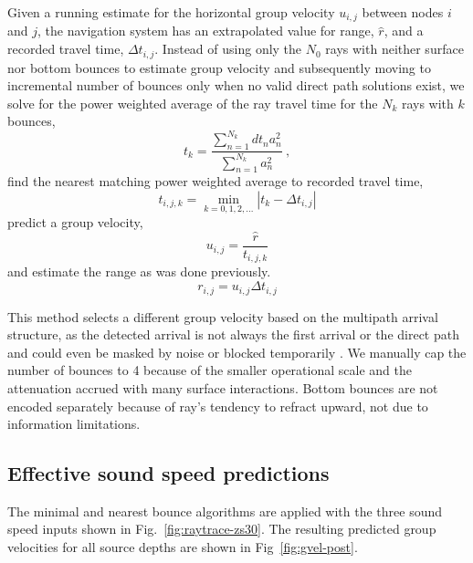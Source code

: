 Given a running estimate for the horizontal group velocity $u_{i,j}$ between nodes $i$ and $j$, the navigation system has an extrapolated value for range, $\hat{r}$, and a recorded travel time, $\Delta t_{i,j}$.
Instead of using only the $N_0$ rays with neither surface nor bottom bounces to estimate group velocity and subsequently moving to incremental number of bounces only when no valid direct path solutions exist, we solve for the power weighted average of the ray travel time for the $N_k$ rays with $k$ bounces,
\begin{equation}
t_k = \frac{\sum_{n=1}^{N_{k}} dt_{n}a_{n}^{2}}{\sum_{n=1}^{N_{k}} a_{n}^{2}} ~, 
\end{equation}
find the nearest matching power weighted average to recorded travel time,
\begin{equation}
t_{i,j,k} = \min_{k=0,1,2,...} \left| t_k - \Delta t_{i,j} \right|
\end{equation}
predict a group velocity,
\begin{equation}
u_{i,j} = \dfrac{\hat{r}}{t_{i,j,k}}
\end{equation}
and estimate the range as was done previously.
\begin{equation}
r_{i,j} = u_{i,j}\Delta t_{i,j}
\end{equation}

This method selects a different group velocity based on the multipath arrival structure, as the detected arrival is not always the first arrival or the direct path and could even be masked by noise or blocked temporarily \citep{deffenbaugh_acoustic_1996}.
We manually cap the number of bounces to 4 because of the smaller operational scale and the attenuation accrued with many surface interactions.
Bottom bounces are not encoded separately because of ray's tendency to refract upward, not due to information limitations.

\subsection{Effective sound speed predictions}

The minimal and nearest bounce algorithms are applied with the three sound speed inputs shown in Fig.~\ref{fig:raytrace-zs30}.
The resulting predicted group velocities for all source depths are shown in Fig~\ref{fig:gvel-post}.

